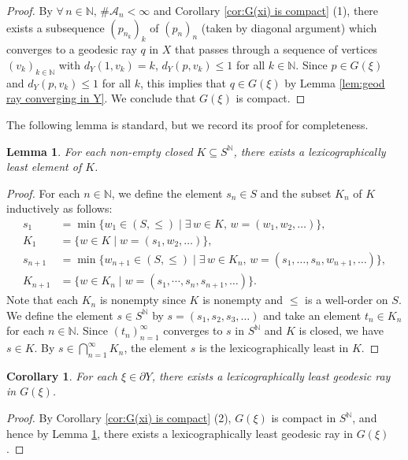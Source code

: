 \documentclass{article}[11pt]
\newtheorem{cor}[thm]{Corollary}
\newtheorem{lem}[thm]{Lemma}
\newcommand{\N}{\mathbb{N}}
\begin{document}
{{\begin{proof}
     By $\forall\,n\in\N,\,\#\mathcal{A}_n<\infty$ and Corollary \ref{cor:G(xi) is compact} (1), there exists a subsequence $(p_{n_k})_k$ of $(p_n)_n$ (taken by diagonal argument) which converges to a geodesic ray $q$ in $X$ that passes through a sequence of vertices $(v_k)_{k \in \N}$ with $d_Y(1,v_k) = k$, $d_Y(p,v_k) \leq 1$ for all $k \in \N$. {\color{black} Since $p \in G(\xi)$ and $d_Y(p, v_k) \leq 1$ for all $k$, this implies that $q \in G(\xi)$ by Lemma \ref{lem:geod ray converging in Y}.} We conclude that $G(\xi)$ is compact. 
     
\end{proof}
}

The following lemma is standard, but we record its proof for completeness.

\begin{lem}
    \label{3}
    For each non-empty {\color{black}closed} $K \subseteq S^{\N}$, there exists a lexicographically least element of $K$.
\end{lem}

\begin{proof}
    {\color{black}For each $n\in \N$, we define the element $s_n\in S$ and the subset $K_n$ of $K$ inductively as follows:
    \begin{align*}
    s_1&=\min \{ w_1 \in (S,\le) \mid \exists\, w\in K,\, w=(w_1,w_2,\ldots) \}, \\
    K_1&=\{ w\in K \mid w=(s_1,w_2,\ldots) \}, \\
    s_{n+1}&=\min \{ w_{n+1} \in (S,\le) \mid \exists\, w\in K_n,\, w=(s_1,\ldots,s_n,w_{n+1},\ldots) \}, \\
    K_{n+1}&=\{ w\in K_n \mid w=(s_1,\cdots,s_n,s_{n+1},\ldots) \}.
    \end{align*}
    Note that each $K_n$ is nonempty since $K$ is nonempty and $\le$ is a well-order on $S$. We define the element $s\in S^\N$ by $s=(s_1,s_{2},s_{3},\ldots)$ and take an element $t_n \in K_n$ for each $n\in\N$. Since $(t_n)_{n=1}^\infty$ converges to $s$ in $S^\N$ and $K$ is closed, we have $s \in K$. By $s \in\bigcap_{n=1}^\infty K_n$, the element $s$ is the lexicographically least in $K$.}
\end{proof}

\begin{cor}
    \label{4}
     For each $\xi \in \partial Y$, there exists a lexicographically least geodesic ray in $G(\xi)$. 
\end{cor}

\begin{proof}
    By Corollary \ref{cor:G(xi) is compact} (2), $G(\xi)$ is compact in $S^{\N}$, and hence by Lemma \ref{3}, there exists a lexicographically least geodesic ray in $G(\xi)$.
\end{proof}

}
\end{document}
